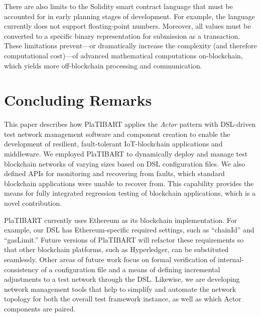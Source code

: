 There are also limits to the Solidity smart contract language that must be accounted for in early planning stages of development. For example, the language currently does not support floating-point numbers. Moreover, all values must be converted to a specific binary representation for submission as a transaction. These limitations prevent---or dramatically increase the complexity (and therefore computational cost)---of advanced mathematical computations on-blockchain, which yields more off-blockchain processing and communication.

 
\section{Concluding Remarks}
\label{conclusion}
This paper describes how PlaTIBART applies the \textit{Actor} pattern with DSL-driven test network management software and component creation to enable the development of resilient, fault-tolerant IoT-blockchain applications and middleware. We employed PlaTIBART to dynamically deploy and manage test blockchain networks of varying sizes based on DSL configuration files. We also defined APIs for monitoring and recovering from faults, which standard blockchain applications were unable to recover from. This capability provides the means for fully integrated regression testing of blockchain applications, which is a novel contribution.

PlaTIBART currently  uses Ethereum as its blockchain implementation. For example, our DSL has Ethereum-specific required settings, such as ``chainId'' and ``gasLimit.'' Future versions of PlaTIBART will refactor these requirements so that other blockchain platforms, such as Hyperledger, can be substituted seamlessly.  Other areas of future work focus on formal verification of internal-consistency of a configuration file and a means of defining incremental adjustments to a test network through the DSL. Likewise, we are developing network management tools that help to simplify and automate the network topology for both the overall test framework instance, as well as which Actor components are paired.



 





